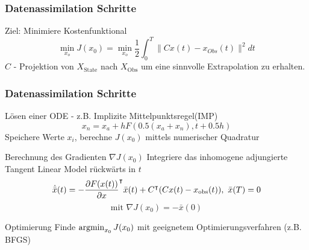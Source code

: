 \begin{frame}[<+->]
  \frametitle{Datenassimilation Schritte}
	\begin{block}{Ziel: Minimiere Kostenfunktional}
	\begin{equation}\label{eq:costFunctional}
		\min_{x_o} J(x_0) = \min_{x_o} \frac{1}{2}\int_0^T \|Cx(t) - x_{Obs}(t)\|^2dt
	\end{equation}
	  $C$ - Projektion von $X_{\text{State}}$ nach $X_{\text{Obs}}$ um eine sinnvolle Extrapolation zu erhalten.
	\end{block}
\end{frame}
 
\begin{frame}[<+->]
  \frametitle{Datenassimilation Schritte}
  \begin{block}{Lösen einer ODE - z.B. Implizite Mittelpunktsregel(IMP)}
	\begin{equation}
	 x_n = x_a + h F \left(0.5 (x_a + x_n), t + 0.5 h\right)
	\end{equation}
	Speichere Werte $x_i$, berechne $J(x_0)$ mittels numerischer Quadratur
  \end{block}
  \begin{block}{Berechnung des Gradienten $\nabla J(x_0)$}
	Integriere das inhomogene adjungierte Tangent Linear Model rückwärts in $t$
	\begin{equation}
	  \dot{ \bar{x}}(t) =  -\frac{\partial F(x(t))}{\partial x}^\intercal \bar x(t) +C^\intercal(Cx(t) - x_{\text{obs}}(t)), ~ \bar x(T) =0
	\end{equation}
	\[
	\text{mit }\nabla J(x_0) = -\bar x(0)
	\]
  \end{block}
  \begin{block}{Optimierung}
  Finde $\operatorname{argmin}_{x_0} J(x_0)$ mit geeignetem Optimierungsverfahren (z.B. BFGS)
  \end{block}

\end{frame} 

